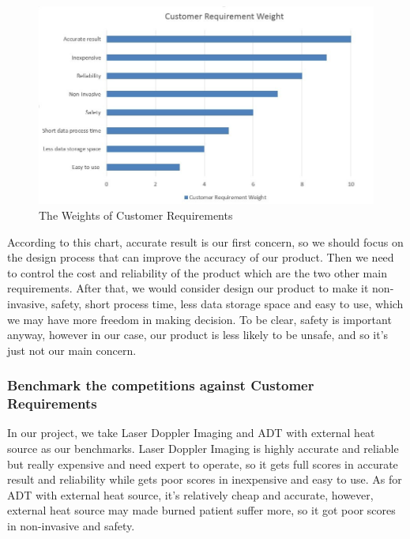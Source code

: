 \documentclass[paper=letter, fontsize=11pt]{scrartcl}
\numberwithin{equation}{section}		%
\numberwithin{figure}{section}			%
\numberwithin{table}{section}			%
\begin{document}
\begin{figure}[H]
    \centering
	\includegraphics[scale=0.7]{CRweight.jpg}
	\caption{The Weights of Customer Requirements}
\end{figure}
According to this chart, accurate result is our first concern, so we should focus on the design process that can improve the accuracy of our product. Then we need to control the cost and reliability of the product which are the two other main requirements. After that, we would consider design our product to make it non-invasive, safety, short process time, less data storage space and easy to use, which we may have more freedom in making decision. To be clear, safety is important anyway, however in our case, our product is less likely to be unsafe, and so it's just not our main concern. 

\subsubsection{Benchmark the competitions against Customer Requirements}
In our project, we take Laser Doppler Imaging and ADT with external heat source as our benchmarks. Laser Doppler Imaging is highly accurate and reliable but really expensive and need expert to operate, so it gets full scores in accurate result and reliability while gets poor scores in inexpensive and easy to use. As for ADT with external heat source, it's relatively cheap and accurate, however, external heat source may made burned patient suffer more, so it got poor scores in non-invasive and safety.
\end{document}
